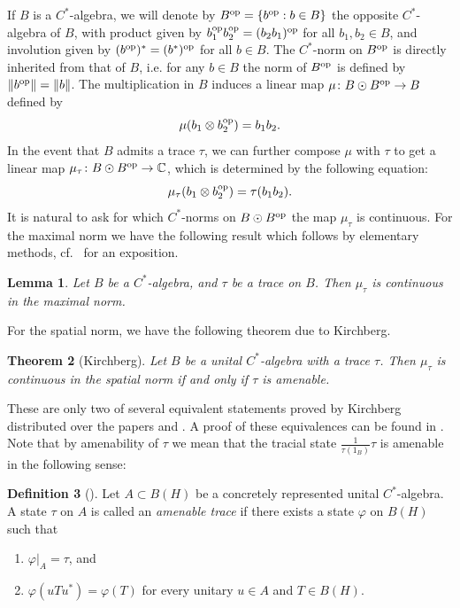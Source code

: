 \documentclass[11pt, a4paper, oneside, final, reqno]{amsart}
\newcommand{\bbC}{\mathbb{C}}
\theoremstyle{definition}
\newtheorem{definition}{Definition}[section]
\theoremstyle{plain}
\newtheorem{theorem}[definition]{Theorem}
\newtheorem{lemma}[definition]{Lemma}
\theoremstyle{remark}
\numberwithin{equation}{section}
\begin{document}
If $B$ is a $C^*$-algebra, we will denote by $B^{\textup{op}}=\{ b^{\rm op}: b\in B\}$ the opposite $C^*$-algebra of $B$, with product given by $b_1^{\rm op}b_2^{\rm op} = (b_2b_1)^{\rm op}$ for all $b_1, b_2\in B$, and involution given by $(b^{\rm op})^* = (b^*)^{\rm op}$ for all $b \in B$. The $C^*$-norm on $B^{\rm op}$ is directly inherited from that of $B$, i.e. for any $b \in B$ the norm of $B^{\rm op}$ is defined by $\|b^{\rm op}\| = \|b\|$. The multiplication in $B$ induces a linear map $\mu \colon B \odot B^{\rm op} \to B$ defined by
\begin{equation*}
    \mu(b_1 \otimes b_2^{\rm op}) = b_1b_2.
\end{equation*}
In the event that $B$ admits a trace $\tau$, we can further compose $\mu$ with $\tau$ to get a linear map $\mu_\tau \colon B \odot B^{\rm op} \to \bbC$, which is determined by the following equation:
\begin{equation*}
    \mu_\tau(b_1 \otimes b_2^{\rm op}) = \tau(b_1b_2).
\end{equation*}
It is natural to ask for which $C^*$-norms on $B \odot B^{\rm op}$ the map $\mu_\tau$ is continuous. For the maximal norm we have the following result which follows by elementary methods, cf.~\cite[p.~21]{Ozawa04} for an exposition.

\begin{lemma}\label{lemma:continuity of maximally entangled state for maximal norm}
    Let $B$ be a $C^*$-algebra, and $\tau$ be a trace on $B$. Then $\mu_\tau$ is continuous in the maximal norm.
\end{lemma}

For the spatial norm, we have the following theorem due to Kirchberg.

\begin{theorem}[Kirchberg]\label{thm:Kirchberg's Theorem for continuity of maximally entangled state}
    Let $B$ be a unital $C^*$-algebra with a trace $\tau$. Then $\mu_\tau$ is continuous in the spatial norm if and only if $\tau$ is amenable.
\end{theorem}

These are only two of several equivalent statements proved by Kirchberg distributed over the papers \cite{Kir93} and \cite{Kir94}. A proof of these equivalences can be found in \cite[Theorem 6.2.7]{BO}. Note that by amenability of $\tau$ we mean that the tracial state $\frac{1}{\tau(1_B)}\tau$ is amenable in the following sense:

\begin{definition}[\cite{BO}]\label{def:amenability of tau}
    Let $A \subset B(H)$ be a concretely represented unital $C^*$-algebra. A state $\tau$ on $A$ is called an \emph{amenable trace} if there exists a state $\varphi$ on $B(H)$ such that
    \begin{enumerate}
        \item $\varphi|_A = \tau$, and
        \item $\varphi(uTu^*) = \varphi(T)$ for every unitary $u \in A$ and $T \in B(H)$.
    \end{enumerate}
\end{definition}
\end{document}
